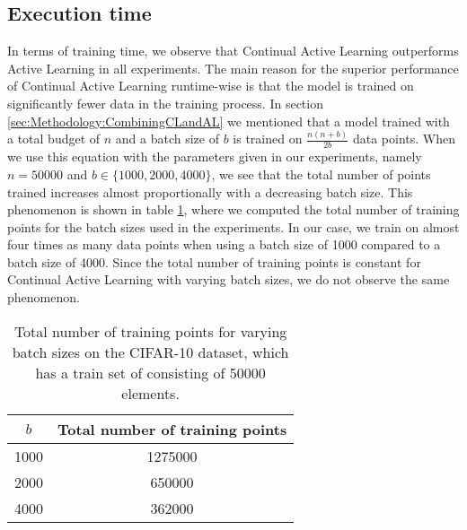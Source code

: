 \subsection{Execution time}
\label{sec:Discussion:ExecutionTime}
In terms of training time, we observe that Continual Active Learning outperforms Active Learning in all experiments. The main reason for the superior
performance of Continual Active Learning runtime-wise is that the model is trained on significantly fewer data in the training process. In section
\ref{sec:Methodology:CombiningCLandAL} we mentioned that a model trained with a total budget of $n$ and a batch size of $b$ is trained on $\frac{n(n+b)}{2b}$
data points. When we use this equation with the parameters given in our experiments, namely $n=50000$ and $b \in \{ 1000, 2000, 4000\}$, we see that
the total number of points trained increases almost proportionally with a decreasing batch size. This phenomenon is shown in table 
\ref{fig:NumberOfTrainingPoints}, where we computed the total number of training points for the batch sizes used in the experiments. In our case,
we train on almost four times as many data points when using a batch size of 1000 compared to a batch size of 4000. Since the total number of training
points is constant for Continual Active Learning with varying batch sizes, we do not observe the same phenomenon. \par

\begin{table}[h]
    \centering
    \begin{tabular}{| c | c |} 
        \hline
        $b$ & Total number of training points \\
        \hline 
        1000 & 1275000 \\
        2000 & 650000 \\
        4000 & 362000 \\
        \hline
    \end{tabular}
    \caption[Total number of data points trained on in the Continual Active Learning experiments]{Total number of training points for varying batch
    sizes on the CIFAR-10 dataset, which has a train set of consisting of 50000 elements.}
    \label{fig:NumberOfTrainingPoints}
\end{table}

